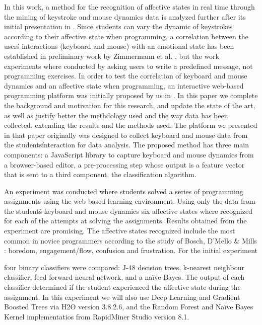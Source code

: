 \documentclass[a4paper,twoside]{article}
\begin{document}
In this work, a method for the recognition of affective states in real
time through the
mining of keystroke and mouse dynamics data is analyzed further after
its initial presentation in \cite{ijcci17}.
Since students can vary the dynamic of keystrokes according
to their affective state when programming, a correlation between the
user\'s interactions (keyboard and mouse) with an emotional state has been
established in preliminary work by Zimmermann
et al. \cite{zimmermann2003affective}, but the work experiments where
conducted by asking users to write a predefined message, not programming
exercises.
In order to test the correlation of keyboard and mouse dynamics and an
affective state when programming, an interactive web-based
programming platform was initially proposed by us in
\cite{ijcci17}. In this paper we complete the background and
motivation for this research, and update the state of the art, as well
as justify better the methdology used and the way data has been
collected, extending the results and the methods used. The platform we
presented in that paper originally was 
designed to collect keyboard and mouse data 
from the students\' interaction for data analysis. The proposed method
has three main components: a JavaScript library to capture keyboard
and mouse dynamics from a browser-based editor, a pre-processing step
whose output is a feature vector that is sent to a third component,
the classification algorithm.

An experiment was conducted where students solved a series of programming
assignments using the web based learning environment. Using only the
data from the student\'s keyboard and mouse dynamics six affective
states where recognized for each of the attempts at solving the
assignments. Results obtained from the experiment are promising. The
affective states recognized include the most common in novice
programmers according to the study of Bosch, D'Mello \& Mills
\cite{bixler2013detecting}: boredom, engagement/flow, confusion and
frustration. For the initial experiment \cite{ijcci17} 

four binary classifiers were compared: J-48 decision trees, k-nearest neighbour
classifier, feed forward neural network, and a na\"ive Bayes. The output of each
classifier determined if the student experienced the affective state during the
assignment. In this experiment we will also use 
Deep Learning \cite{candel2016deep} and  Gradient Boosted Trees 
via H2O version 3.8.2.6, and the Random Forest and Na\"ive Bayes Kernel 
implementatios from RapidMiner Studio version 8.1.
\end{document}
